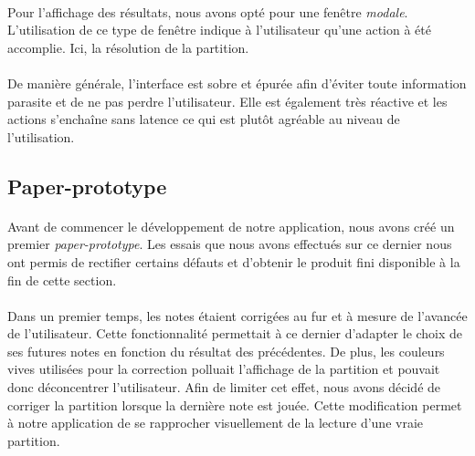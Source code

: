 \documentclass[a4paper, 12pt]{article}
\begin{document}
    \paragraph{}
    Pour l'affichage des résultats, nous avons opté pour une fenêtre \emph{modale}. L'utilisation de ce type de fenêtre indique à l'utilisateur qu'une action à été accomplie. Ici, la résolution de la partition.
    
    \paragraph{}
    De manière générale, l'interface est sobre et épurée afin d'éviter toute information parasite et de ne pas perdre l'utilisateur. Elle est également très réactive et les actions s'enchaîne sans latence ce qui est plutôt agréable au niveau de l'utilisation.
    
    
    \subsection{Paper-prototype}
    \label{subsec:Paper-prototype}
    
    \paragraph{}
    Avant de commencer le développement de notre application, nous avons créé un premier \emph{paper-prototype}. Les essais que nous avons effectués sur ce dernier nous ont permis de rectifier certains défauts et d'obtenir le produit fini disponible à la fin de cette section.
    \paragraph{}
    Dans un premier temps, les notes étaient corrigées au fur et à mesure de l'avancée de l'utilisateur. Cette fonctionnalité permettait à ce dernier d'adapter le choix de ses futures notes en fonction du résultat des précédentes. De plus, les couleurs vives utilisées pour la correction polluait l'affichage de la partition et pouvait donc déconcentrer l'utilisateur. Afin de limiter cet effet, nous avons décidé de corriger la partition lorsque la dernière note est jouée. Cette modification permet à notre application de se rapprocher visuellement de la lecture d'une vraie partition.
    
\end{document}
